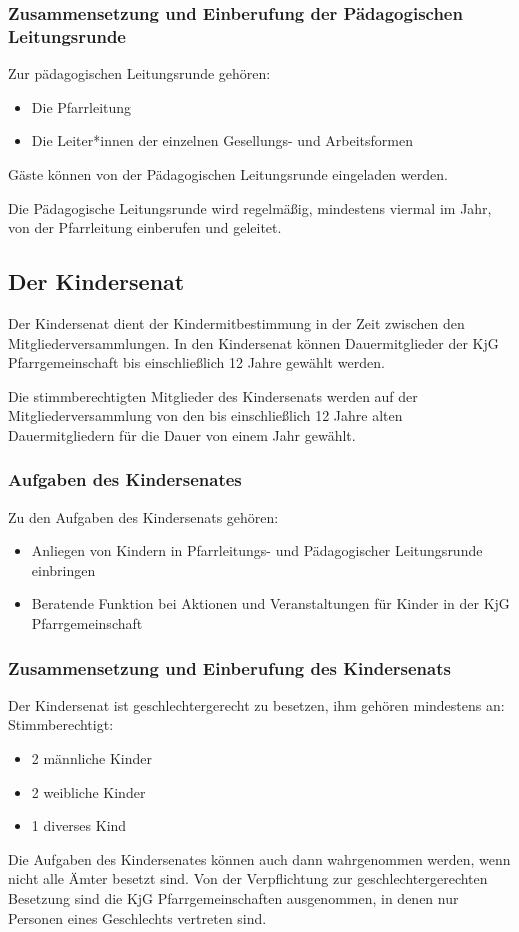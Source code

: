 \documentclass[12pt]{report}
\begin{document}
\begin{flushleft}
\subsubsection{Zusammensetzung und Einberufung der Pädagogischen Leitungsrunde}
Zur pädagogischen Leitungsrunde gehören:
\begin{itemize}
  \item Die Pfarrleitung
  \item Die Leiter*innen der einzelnen Gesellungs- und Arbeitsformen
\end{itemize}

Gäste können von der Pädagogischen Leitungsrunde eingeladen werden.

Die Pädagogische Leitungsrunde wird regelmäßig, mindestens viermal im Jahr,
von der Pfarrleitung einberufen und geleitet.

\subsection{Der Kindersenat}
Der Kindersenat dient der Kindermitbestimmung in der Zeit zwischen den Mitgliederversammlungen.
In den Kindersenat können Dauermitglieder der KjG Pfarrgemeinschaft bis einschließlich 12
Jahre gewählt werden.

Die stimmberechtigten Mitglieder des Kindersenats werden auf der Mitgliederversammlung von
den bis einschließlich 12 Jahre alten Dauermitgliedern für die Dauer von einem Jahr gewählt.

\subsubsection{Aufgaben des Kindersenates}
Zu den Aufgaben des Kindersenats gehören:
\begin{itemize}
  \item Anliegen von Kindern in Pfarrleitungs- und Pädagogischer Leitungsrunde einbringen
  \item Beratende Funktion bei Aktionen und Veranstaltungen für Kinder in der KjG Pfarrgemeinschaft
\end{itemize}

\subsubsection{Zusammensetzung und Einberufung des Kindersenats}

Der Kindersenat ist {\color{red}geschlechtergerecht} zu besetzen, ihm gehören mindestens an:
Stimmberechtigt:
{\color{red}
\begin{itemize}
  \item 2 männliche Kinder
  \item 2 weibliche Kinder
  \item 1 diverses Kind
\end{itemize}
} %
Die Aufgaben des Kindersenates können auch dann wahrgenommen werden, wenn nicht alle Ämter besetzt sind.
{\color{red}Von der Verpflichtung zur geschlechtergerechten Besetzung sind die KjG Pfarrgemeinschaften ausgenommen,
in denen nur Personen eines Geschlechts vertreten sind.}


\end{flushleft}
\end{document}
